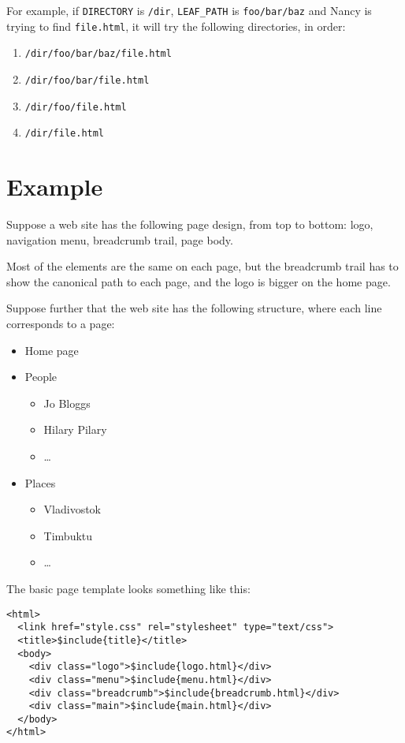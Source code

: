 \documentclass[english]{scrartcl}
\begin{document}
For example, if \verb|DIRECTORY| is \verb|/dir|, \verb|LEAF_PATH| is \verb|foo/bar/baz| and Nancy is trying to find \verb|file.html|, it will try the following directories, in order:

\begin{enumerate}
\item \verb|/dir/foo/bar/baz/file.html|
\item \verb|/dir/foo/bar/file.html|
\item \verb|/dir/foo/file.html|
\item \verb|/dir/file.html|
\end{enumerate}

\section{Example}

Suppose a web site has the following page design, from top to bottom: logo, navigation menu, breadcrumb trail, page body.

Most of the elements are the same on each page, but the breadcrumb trail has to show the canonical path to each page, and the logo is bigger on the home page.

Suppose further that the web site has the following structure, where each line corresponds to a page:

\begin{itemize}
\item Home page
\item People
  \begin{itemize}
  \item Jo Bloggs
  \item Hilary Pilary
  \item \dots
  \end{itemize}
\item Places
  \begin{itemize}
  \item Vladivostok
  \item Timbuktu
  \item \dots
  \end{itemize}
\end{itemize}

The basic page template looks something like this:

\begin{verbatim}
<html>
  <link href="style.css" rel="stylesheet" type="text/css">
  <title>$include{title}</title>
  <body>
    <div class="logo">$include{logo.html}</div>
    <div class="menu">$include{menu.html}</div>
    <div class="breadcrumb">$include{breadcrumb.html}</div>
    <div class="main">$include{main.html}</div>
  </body>
</html>
\end{verbatim}
\end{document}
